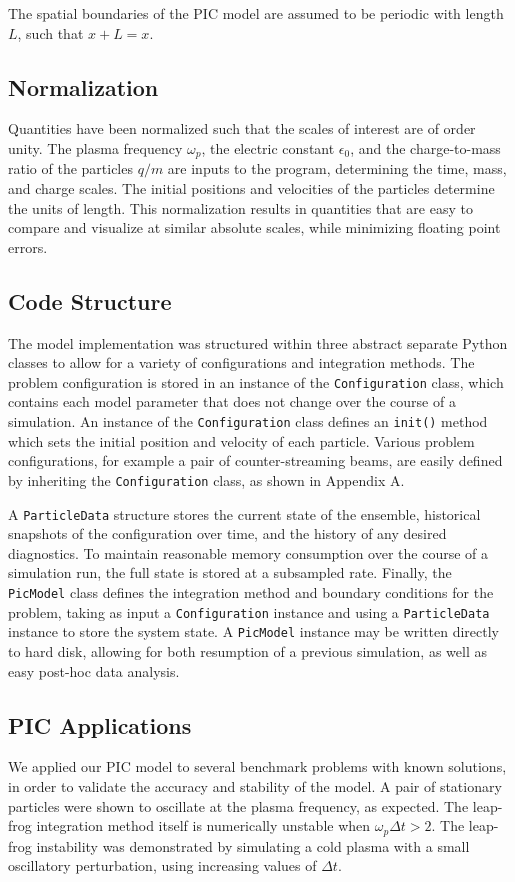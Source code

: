 \documentclass[%
 reprint,
 amsmath,amssymb,
 aps,
]{revtex4-2}
\begin{document}
The spatial boundaries of the PIC model are assumed to be periodic with length $L$, such that $x + L = x$.
\subsection{Normalization}
Quantities have been normalized such that the scales of interest are of order unity. The plasma frequency $\omega_p$, the electric constant $\epsilon_0$, and the charge-to-mass ratio of the particles $q/m$ are inputs to the program, determining the time, mass, and charge scales. The initial positions and velocities of the particles determine the units of length. This normalization results in quantities that are easy to compare and visualize at similar absolute scales, while minimizing floating point errors.
\subsection{Code Structure}
The model implementation was structured within three abstract separate Python classes to allow for a variety of configurations and integration methods. The problem configuration is stored in an instance of the \texttt{Configuration} class, which contains each model parameter that does not change over the course of a simulation. An instance of the \texttt{Configuration} class defines an \texttt{init()} method which sets the initial position and velocity of each particle. Various problem configurations, for example a pair of counter-streaming beams, are easily defined by inheriting the \texttt{Configuration} class, as shown in Appendix A.

A \texttt{ParticleData} structure stores the current state of the ensemble, historical snapshots of the configuration over time, and the history of any desired diagnostics. To maintain reasonable memory consumption over the course of a simulation run, the full state is stored at a subsampled rate. Finally, the \texttt{PicModel} class defines the integration method and boundary conditions for the problem, taking as input a \texttt{Configuration} instance and using a \texttt{ParticleData} instance to store the system state. A \texttt{PicModel} instance may be written directly to hard disk, allowing for both resumption of a previous simulation, as well as easy post-hoc data analysis.
\subsection{PIC Applications}
We applied our PIC model to several benchmark problems with known solutions, in order to validate the accuracy and stability of the model. A pair of stationary particles were shown to oscillate at the plasma frequency, as expected. The leap-frog integration method itself is numerically unstable when $\omega_p \Delta t > 2$. The leap-frog instability was demonstrated by simulating a cold plasma with a small oscillatory perturbation, using increasing values of $\Delta t$.
\end{document}
